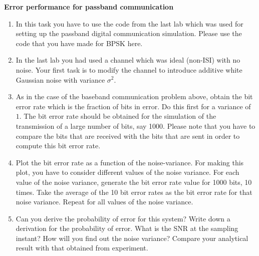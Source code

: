 \myhrule
\noindent
\textbf{Error performance for passband communication}
\begin{enumerate}
\item In this task you have to use the code from the last lab which was used for setting up the passband digital communication simulation. Please use the code that you have made for BPSK here.
\item In the last lab you had used a channel which was ideal (non-ISI) with no noise. Your first task is to modify the channel to introduce additive white Gaussian noise with variance $\sigma^{2}$.
\item As in the case of the baseband communication problem above, obtain the bit error rate which is the fraction of bits in error. Do this first for a variance of $1$. The bit error rate should be obtained for the simulation of the transmission of a large number of bits, say 1000. Please note that you have to compare the bits that are received with the bits that are sent in order to compute this bit error rate.
\item Plot the bit error rate as a function of the noise-variance. For making this plot, you have to consider different values of the noise variance. For each value of the noise variance, generate the bit error rate value for 1000 bits, 10 times. Take the average of the 10 bit error rates as the bit error rate for that noise variance. Repeat for all values of the noise variance.
\item Can you derive the probability of error for this system? Write down a derivation for the probability of error. What is the SNR at the sampling instant? How will you find out the noise variance? Compare your analytical result with that obtained from experiment.
\end{enumerate}

